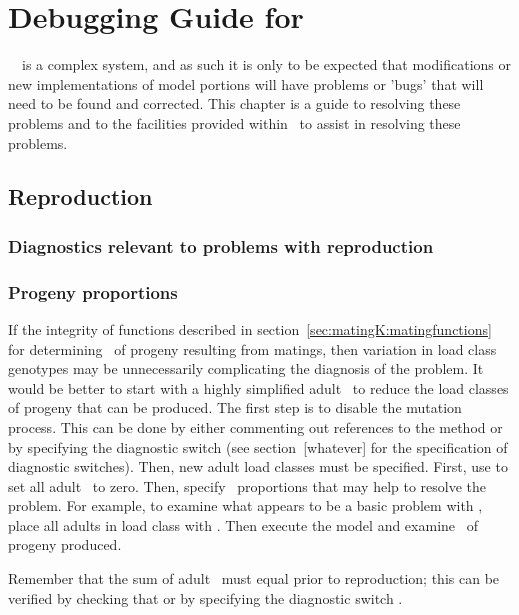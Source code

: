 % 

\chapter{Debugging Guide for \K}

\REDO\  \K\ is a complex system, and as such it is only to be expected that modifications or new implementations of model portions will have problems or 'bugs' that will need to be found and corrected.  This chapter is a guide to resolving these problems and to the facilities provided within \K\ to assist in resolving these problems.

\section{Reproduction}

\subsection{Diagnostics relevant to problems with reproduction}

\subsection{Progeny proportions}

If the integrity of functions described in section~\ref{sec:matingK:matingfunctions} for determining \Lijg\ of progeny resulting from matings, then variation in load class genotypes may be unnecessarily complicating the diagnosis of the problem.  It would be better to start with a highly simplified adult \Lijg\ to reduce the load classes of progeny that can be produced.  The first step is to disable the mutation process.  This can be done by either commenting out references to the method  or by specifying the diagnostic switch  (see section~[whatever] for the specification of diagnostic switches).  Then, new adult load classes must be specified.  First, use  to set all adult \Lijg\ to zero.  Then, specify \Lijg\ proportions that may help to resolve the problem.  For example, to examine what appears to be a basic problem with , place all adults in load class  with .  Then execute the model and examine \Lijg\ of progeny produced.

Remember that the sum of adult \Lijg\ must equal  prior to reproduction; this can be verified by checking that  or by specifying the diagnostic switch .


